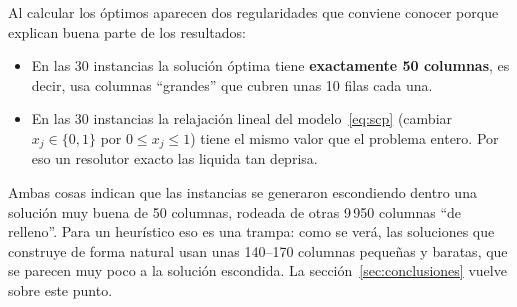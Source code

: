Al calcular los óptimos aparecen dos regularidades que conviene conocer porque explican
buena parte de los resultados:
\begin{itemize}
  \item En las 30 instancias la solución óptima tiene \textbf{exactamente 50 columnas}, es
        decir, usa columnas ``grandes'' que cubren unas 10 filas cada una.
  \item En las 30 instancias la relajación lineal del modelo~\eqref{eq:scp} (cambiar
        $x_j\in\{0,1\}$ por $0\le x_j\le 1$) tiene el mismo valor que el problema entero. Por
        eso un resolutor exacto las liquida tan deprisa.
\end{itemize}
Ambas cosas indican que las instancias se generaron escondiendo dentro una solución muy buena
de 50 columnas, rodeada de otras 9\,950 columnas ``de relleno''. Para un heurístico eso es
una trampa: como se verá, las soluciones que construye de forma natural usan unas 140--170
columnas pequeñas y baratas, que se parecen muy poco a la solución escondida. La
sección~\ref{sec:conclusiones} vuelve sobre este punto.
